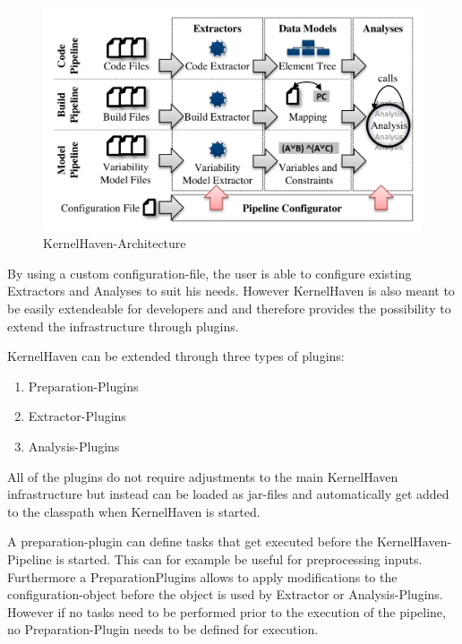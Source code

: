 \documentclass[a4paper]{article}
\begin{document}
\begin{figure}[h] 
  \centering
  \begin{minipage}[b]{1\textwidth} 
    \caption[KernelHaven-Pipeline]{KernelHaven-Architecture \cite{KroeherEl-SharkawySchmid18}}\label{pipeline}
    \includegraphics[width=1\textwidth]{img/KernelHaven-Pipeline.png}
  \end{minipage}
\end{figure}

By using a custom configuration-file, the user is able to configure existing Extractors and Analyses to suit his needs. However KernelHaven is also meant to be easily extendeable for developers and and therefore provides the possibility to extend the infrastructure through plugins.

KernelHaven can be extended through three types of plugins:

\begin{enumerate}
    \item Preparation-Plugins
	\item Extractor-Plugins
	\item Analysis-Plugins
\end{enumerate}

All of the plugins do not require adjustments to the main KernelHaven infrastructure but instead can be loaded as jar-files and automatically get added to the classpath when KernelHaven is started.

A preparation-plugin can define tasks that get executed before the KernelHaven-Pipeline is started. This can for example be useful for preprocessing inputs. Furthermore a PreparationPlugins allows to apply modifications to the configuration-object before the object is used by Extractor or Analysis-Plugins. However if no tasks need to be performed prior to the execution of the pipeline, no Preparation-Plugin needs to be defined for execution. 
\end{document}
